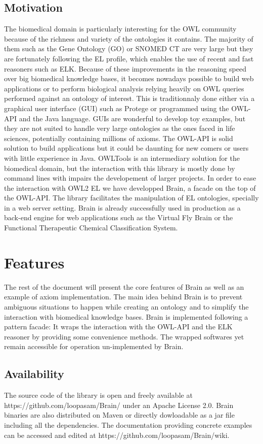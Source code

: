 \documentclass{llncs}
\begin{document}
\subsection{Motivation}
The biomedical domain is particularly interesting for the OWL community because of the richness and variety of the ontologies it contains.
The majority of them such as the Gene Ontology (GO) or SNOMED CT are very large but they are fortunately following 
the EL profile, which enables the use of recent and fast reasoners such as ELK.
Because of these improvements in the reasoning speed over big biomedical knowledge bases, 
it becomes nowadays possible to build web applications or to perform biological analysis relying heavily on OWL queries performed against
an ontology of interest. This is traditionnaly done either via a graphical user interface (GUI) such as Protege or programmed
using the OWL-API and the Java language. GUIs are wonderful to develop toy examples, but they are not suited to handle very large 
ontologies as the ones faced in life sciences, potentially containing millions of axioms. The OWL-API is solid solution to build
applications but it could be daunting for new comers or users with little experience in Java. OWLTools is an intermediary solution for the
biomedical domain, but the interaction with this library is mostly done by command lines with impairs the developement of larger projects.
In order to ease the interaction with OWL2 EL we have developped Brain, a facade on the top of the OWL-API. The library facilitates the
manipulation of EL ontologies, specially in a web server setting. 
Brain is already successfully used in production as a back-end engine for web applications 
such as the Virtual Fly Brain or the Functional Therapeutic Chemical Classification System.

\section{Features}
The rest of the document will present the core features of Brain as well as an example of axiom implementation.
The main idea behind Brain is to prevent ambiguous situations to happen while creating an ontology and to simplify 
the interaction with biomedical knowledge bases. Brain is implemented following a pattern facade: 
It wraps the interaction with the OWL-API and the ELK reasoner by providing some convenience methods.
The wrapped softwares yet remain accessible for operation un-implemented by Brain.

\subsection{Availability}
The source code of the library is open and freely available at https://github.com/loopasam/Brain/ under an Apache License 2.0.
Brain binaries are also distributed on Maven or directly dowloadable as a jar file including all the dependencies.
The documentation providing concrete examples can be accessed and edited at https://github.com/loopasam/Brain/wiki.
\end{document}
